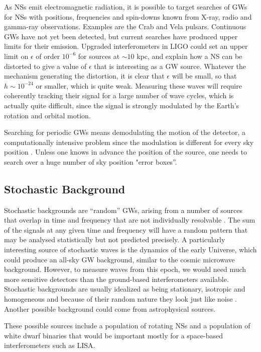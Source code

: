 \documentclass[binding=0.6cm, LaM]{sapthesis}
\begin{document}
	As NSs emit electromagnetic radiation, 
	it is possible to target searches of GWs for NSs with positions, 
	frequencies and spin-downs known from X-ray, radio and gamma-ray observations. 
	Examples are the Crab and Vela pulsars. 
	Continuous GWs have not yet been detected, 
	but current searches have produced upper limits for their emission. 
	Upgraded interferometers in LIGO could set an upper limit on
	$\epsilon$ of order $10^{-6}$ for sources at $\sim10$ kpc, 
	and explain how a NS can be distorted to give a value of $\epsilon$ that is interesting as a GW source. 
	Whatever the mechanism generating the distortion, 
	it is clear that $\epsilon$ will be small,
	so that $h \sim 10^{-24}$ or smaller, which is quite weak. 
	Measuring these waves will require
	coherently tracking their signal for a large number of wave cycles, 
	which is actually quite difficult, 
	since the signal is strongly modulated by the Earth’s rotation and orbital motion.

	Searching for periodic GWs means demodulating the motion of the detector, 
	a computationally intensive problem since the modulation is different for every sky position \cite{4}. 
	Unless one knows in advance the position of the source, 
	one needs to search over a huge number of sky position "error boxes”.

\subsection{Stochastic Background}
	Stochastic backgrounds are “random” GWs, 
	arising from a number of sources that overlap 
	in time and frequency that are not individually resolvable \cite{22}. 
	The sum of the signals at any given time and frequency will have 
	a random pattern that may be analysed statistically but not predicted precisely.
	A particularly interesting source of stochastic waves is the dynamics of the early Universe, 
	which could produce an all-sky GW background, 
	similar to the cosmic microwave background.
	However, to measure waves from this epoch, 
	we would need much more sensitive detectors than the ground-based interferometers available.
	Stochastic backgrounds are usually idealized as being stationary, 
	isotropic and homogeneous and because of their random nature they look just like noise \cite{4}.	
	Another possible background could come from astrophysical sources.

	These possible sources include a population of rotating NSs 
	and a population of white dwarf binaries that would be important mostly for a space-based interferometers such as LISA. 
\end{document}
